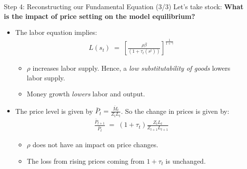 \documentclass[10pt,c,aspectratio=1610,handout]{beamer}
\begin{document}
\begin{frame}{Step 4: Reconstructing our Fundamental Equation (3/3)}%
  Let's take stock: \textbf{What is the impact of price setting on the model equilibrium?}%
  \begin{itemize}%
    \item[$\blacktriangleright$] The labor equation implies:%
    \begin{align*}%
      L(s_{t}) \; = \; \left[ \frac{\rho \beta}{(1+\tau_{t}(s^{t}))} \right]^{\frac{1}{1+\gamma}}%
    \end{align*}%
    \vspace*{-0.2in}%
    \begin{itemize}%
      \item[$\rightarrow$] $\rho$ increases labor supply. Hence, a \emph{low substitutability of goods} lowers labor supply.%
      \item[$\rightarrow$] Money growth \textit{lowers} labor and output.%
    \end{itemize}%
    \vspace*{0.2in}%
    \pause%
    \item[$\blacktriangleright$] The price level is given by $\bar{P}_t = \frac{\bar{M}_{t}}{Z_t L_t}$. So the change in prices is given by:%
    \begin{align*}%
      \frac{\bar{P}_{t+1}}{\bar{P}_{t}} \; = \; (1+\tau_t) \frac{Z_t L_t}{Z_{t+1} L_{t+1}}%
    \end{align*}%
    \vspace*{-0.2in}%
    \begin{itemize}%
      \item[$\rightarrow$] $\rho$ does not have an impact on price changes.%
      \item[$\rightarrow$] The loss from rising prices coming from $1+\tau_t$ is unchanged.%
    \end{itemize}%
  \end{itemize}%
\end{frame}%
\end{document}
